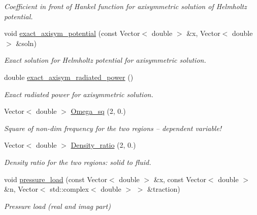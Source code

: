 \begin{DoxyCompactItemize}
\begin{DoxyCompactList}\small\item\em Coefficient in front of Hankel function for axisymmetric solution of Helmholtz potential. \end{DoxyCompactList}\item 
void \hyperlink{namespaceGlobal__Parameters_af95baf4096a1393ab06bfa9ff9a57a35}{exact\+\_\+axisym\+\_\+potential} (const Vector$<$ double $>$ \&x, Vector$<$ double $>$ \&soln)
\begin{DoxyCompactList}\small\item\em Exact solution for Helmholtz potential for axisymmetric solution. \end{DoxyCompactList}\item 
double \hyperlink{namespaceGlobal__Parameters_a79131fd1bf3eb1ab080c21c2d98a92d5}{exact\+\_\+axisym\+\_\+radiated\+\_\+power} ()
\begin{DoxyCompactList}\small\item\em Exact radiated power for axisymmetric solution. \end{DoxyCompactList}\item 
Vector$<$ double $>$ \hyperlink{namespaceGlobal__Parameters_a461bb148c1f6494672520bdf8045483f}{Omega\+\_\+sq} (2, 0.)
\begin{DoxyCompactList}\small\item\em Square of non-\/dim frequency for the two regions -- dependent variable! \end{DoxyCompactList}\item 
Vector$<$ double $>$ \hyperlink{namespaceGlobal__Parameters_a3ad42a80620a3847cf0d1b187e2ed2ec}{Density\+\_\+ratio} (2, 0.)
\begin{DoxyCompactList}\small\item\em Density ratio for the two regions\+: solid to fluid. \end{DoxyCompactList}\item 
void \hyperlink{namespaceGlobal__Parameters_a0ddb3a77481b907fbb34f2e8d0a6eb9f}{pressure\+\_\+load} (const Vector$<$ double $>$ \&x, const Vector$<$ double $>$ \&n, Vector$<$ std\+::complex$<$ double $>$ $>$ \&traction)
\begin{DoxyCompactList}\small\item\em Pressure load (real and imag part) \end{DoxyCompactList}\end{DoxyCompactItemize}
